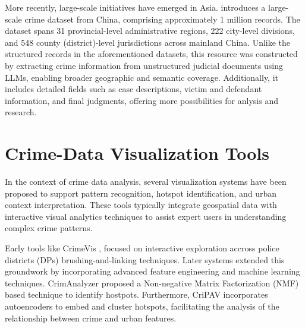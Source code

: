 More recently, large-scale initiatives have emerged in Asia. \cite{Zhang2025CrimeDatasetChina} introduces a large-scale crime dataset from China, comprising approximately 1 million records. The dataset spans 31 provincial-level administrative regions, 222 city-level divisions, and 548 county (district)-level jurisdictions across mainland China. Unlike the structured records in the aforementioned datasets, this resource was constructed by extracting crime information from unstructured judicial documents using LLMs, enabling broader geographic and semantic coverage. Additionally, it includes detailed fields such as case descriptions, victim and defendant information, and final judgments, offering more possibilities for anlysis and research.



\section{Crime-Data Visualization Tools}

In the context of crime data analysis, several visualization systems have been proposed to support pattern recognition, hotspot identification, and urban context interpretation. These tools typically integrate geospatial data with interactive visual analytics techniques to assist expert users in understanding complex crime patterns.

Early tools like CrimeVis \cite{Silva2017CrimeVisAI}, focused on interactive exploration accross police districts (DPs) brushing-and-linking techniques. Later systems extended this groundwork by incorporating advanced feature engineering and machine learning techniques. CrimAnalyzer \cite{Garcia2021CrimAnalyzer} proposed a Non-negative Matrix Factorization (NMF) based technique to identify hostpots. Furthermore, CriPAV \cite{Garcia2022CriPAV} incorporates autoencoders to embed and cluster hotspots, facilitating the analysis of the relationship between crime and urban features.







